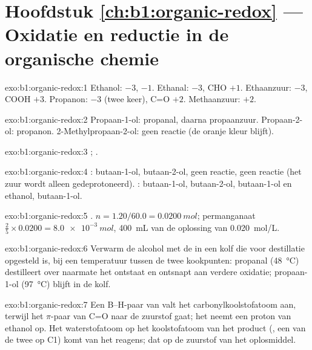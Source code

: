 \section*{Hoofdstuk \ref{ch:b1:organic-redox} --- Oxidatie en reductie in de organische chemie}

\begin{solution}{exo:b1:organic-redox:1}
Ethanol:  $-3$,  $-1$. Ethanal:  $-3$, CHO $+1$.
Ethaanzuur:  $-3$, COOH $+3$. Propanon:  $-3$ (twee keer),
C=O $+2$. Methaanzuur: $+2$.
\end{solution}

\begin{solution}{exo:b1:organic-redox:2}
Propaan-1-ol: propanal, daarna propaanzuur. Propaan-2-ol: propanon.
2-Methylpropaan-2-ol: geen reactie (de oranje kleur blijft).
\end{solution}

\begin{solution}{exo:b1:organic-redox:3}
;
.
\end{solution}

\begin{solution}{exo:b1:organic-redox:4}
: butaan-1-ol, butaan-2-ol, geen reactie, geen reactie (het zuur
wordt alleen gedeprotoneerd). : butaan-1-ol, butaan-2-ol,
butaan-1-ol en ethanol, butaan-1-ol.
\end{solution}

\begin{solution}{exo:b1:organic-redox:5}
.
$n = 1.20/60.0 = \qty{0.0200}{mol}$; permanganaat $\frac25 \times 0.0200 =
\qty{8.0e-3}{mol}$, \qty{400}{mL} van de oplossing van \qty{0.020}{mol/L}.
\end{solution}

\begin{solution}{exo:b1:organic-redox:6}
Verwarm de alcohol met de  in een kolf die voor destillatie
opgesteld is, bij een temperatuur tussen de twee kookpunten: propanal
(\qty{48}{\celsius}) destilleert over naarmate het ontstaat en ontsnapt
aan verdere oxidatie; propaan-1-ol (\qty{97}{\celsius}) blijft in de
kolf.
\end{solution}

\begin{solution}{exo:b1:organic-redox:7}
Een B--H-paar van  valt het carbonylkoolstofatoom aan, terwijl
het $\pi$-paar van C=O naar de zuurstof gaat; het  neemt een
proton van ethanol op. Het waterstofatoom op het koolstofatoom van het
product (, een van de twee op C1) komt van het reagens; dat
op de zuurstof van het oplosmiddel.
\end{solution}

